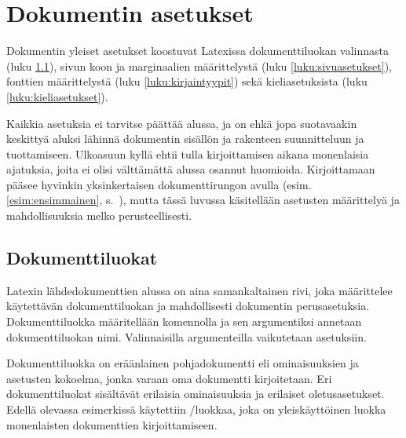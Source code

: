 
\chapter{Dokumentin asetukset}

Dokumentin yleiset asetukset koostuvat Latexissa dokumenttiluokan
valinnasta (luku \ref{luku:dokumenttiluokat}), sivun koon ja
marginaalien määrittelystä (luku \ref{luku:sivuasetukset}), fonttien
määrittelystä (luku \ref{luku:kirjaintyypit}) sekä kieliasetuksista
(luku \ref{luku:kieliasetukset}).

Kaikkia asetuksia ei tarvitse päättää alussa, ja on ehkä jopa
suotavaakin keskittyä aluksi lähinnä dokumentin sisällön ja rakenteen
suunnitteluun ja tuottamiseen. Ulkoasuun kyllä ehtii tulla
kirjoittamisen aikana monenlaisia ajatuksia, joita ei olisi välttämättä
alussa osannut huomioida. Kirjoittamaan pääsee hyvinkin yksinkertaisen
dokumenttirungon avulla (esim. \ref{esim:ensimmainen},
s.~\pageref{esim:ensimmainen}), mutta tässä luvussa käsitellään
asetusten määrittelyä ja mahdollisuuksia melko perusteellisesti.

\section{Dokumenttiluokat}
\label{luku:dokumenttiluokat}

Latexin lähdedokumenttien alussa on aina samankaltainen rivi, joka
määrittelee käytettävän dokumenttiluokan ja mahdollisesti dokumentin
pe\-rus\-ase\-tuk\-sia. Dokumenttiluokka määritellään komennolla
 ja sen argumentiksi annetaan
dokumenttiluokan nimi. Valinnaisilla argumenteilla vaikutetaan
asetuksiin.


Dokumenttiluokka on eräänlainen pohjadokumentti eli ominaisuuksien ja
asetusten kokoelma, jonka varaan oma dokumentti kirjoitetaan. Eri
dokumenttiluokat sisältävät erilaisia ominaisuuksia ja erilaiset
oletusasetukset. Edellä olevassa esimerkissä käytettiin
\-/luokkaa, joka on yleiskäyttöinen luokka
monenlaisten dokumenttien kirjoittamiseen.


